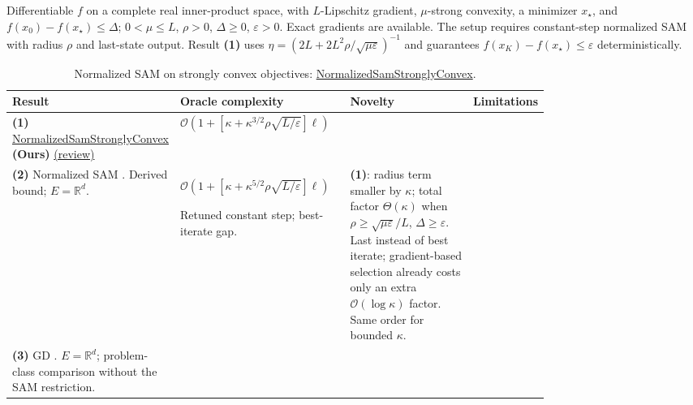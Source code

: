 \begin{table}[tp]
\centering
\caption{Normalized SAM on strongly convex objectives: \href{https://github.com/k3nfalt/longtails/blob/main/LongTails/Setups/NormalizedSamStronglyConvex.lean}{NormalizedSamStronglyConvex}.}\label{tab:NormalizedSamStronglyConvex}
\parbox{\linewidth}{\footnotesize Differentiable $f$ on a complete real inner-product space, with $L$-Lipschitz gradient, $\mu$-strong convexity, a minimizer $x_\star$, and $f(x_0)-f(x_\star)\leq\Delta$; $0<\mu\leq L$, $\rho>0$, $\Delta\geq0$, $\varepsilon>0$. Exact gradients are available. The setup requires constant-step normalized SAM with radius $\rho$ and last-state output. Result \textbf{(1)} uses $\eta=(2L+2L^2\rho/\sqrt{\mu\varepsilon})^{-1}$ and guarantees $f(x_K)-f(x_\star)\leq\varepsilon$ deterministically.}\par\smallskip
\begin{threeparttable}
\footnotesize
\setlength{\tabcolsep}{4pt}\renewcommand{\arraystretch}{1.25}
\begin{tabularx}{\linewidth}{@{}>{\raggedright\arraybackslash}p{0.20\linewidth}>{\raggedright\arraybackslash}p{0.32\linewidth}>{\raggedright\arraybackslash}p{0.25\linewidth}>{\raggedright\arraybackslash}X@{}}
\toprule
\textbf{Result} & \textbf{Oracle complexity} & \textbf{Novelty} & \textbf{Limitations} \\
\midrule
\textbf{(1)} \href{https://github.com/k3nfalt/longtails/blob/main/LongTails/Theorems/NormalizedSamStronglyConvex.lean}{Normalized\allowbreak Sam\allowbreak Strongly\allowbreak Convex} \textbf{(Ours)} \href{https://github.com/k3nfalt/longtails/blob/main/scripts/reviews/NormalizedSamStronglyConvex.md}{(review)}
& $\mathcal{O}\!\left(1+\left[\kappa+\kappa^{3/2}\rho\sqrt{L/\varepsilon}\right]\ell\right)$ & & \\
\midrule[1.2pt]
\textbf{(2)} Normalized SAM \citep[App.~B.2, Eq.~(6)]{nsscSiYun2023v3}. Derived bound; $E=\mathbb{R}^d$.
& $\mathcal{O}\!\left(1+\left[\kappa+\kappa^{5/2}\rho\sqrt{L/\varepsilon}\right]\ell\right)$\par Retuned constant step; best-iterate gap.
& \textbf{(1)}: radius term smaller by $\kappa$; total factor $\Theta(\kappa)$ when $\rho\geq\sqrt{\mu\varepsilon}/L$, $\Delta\geq\varepsilon$. Last instead of best iterate; gradient-based selection already costs only an extra $\mathcal{O}(\log\kappa)$ factor. Same order for bounded $\kappa$.
& \\
\midrule
\textbf{(3)} GD \citep[Thm.~1]{nsscKarimi2016v1}. $E=\mathbb{R}^d$; problem-class comparison without the SAM restriction.

\end{tabularx}
\end{threeparttable}
\end{table}
